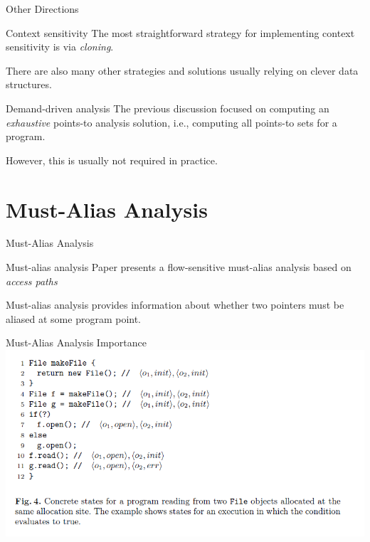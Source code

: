 \documentclass{beamer}
\begin{document}
\begin{frame}{Other Directions}
	\begin{block}{Context sensitivity}
		The most straightforward strategy for implementing context sensitivity
		is via \textit{cloning}.
	\end{block}
	\pause
	\begin{block}{}
		There are also many other strategies and solutions usually relying on clever data structures.
	\end{block}
	\pause
	\begin{block}{Demand-driven analysis}
		The previous discussion focused on computing an \textit{exhaustive} points-to analysis
		solution, i.e., computing all points-to sets for a program.
	\end{block}
	\pause
	\begin{block}{}
		However, this is usually not required in practice.
	\end{block}
\end{frame}

\section{Must-Alias Analysis}

\begin{frame}{Must-Alias Analysis}
	\begin{block}{Must-alias analysis}
		Paper presents a flow-sensitive must-alias analysis based on \textit{access paths}
	\end{block}
	\pause
	\begin{block}{}
		Must-alias analysis provides information about whether two pointers must be
		aliased at some program point.
	\end{block}
\end{frame}

\begin{frame}{Must-Alias Analysis Importance}
	\includegraphics[width=\paperwidth]{fig4.png}
\end{frame}
\end{document}
